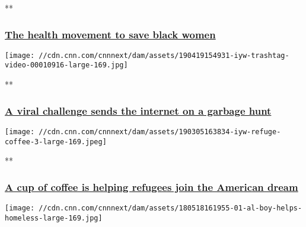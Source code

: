 **

\hypertarget{the-health-movement-to-save-black-women-}{%
\subsubsection{\texorpdfstring{\href{/videos/tv/2019/05/21/iyw-girl-trek.cnn/video/playlists/impact-your-world/}{The
health movement to save black women
}}{The health movement to save black women }}\label{the-health-movement-to-save-black-women-}}

\href{/videos/tv/2019/04/19/iyw-trashtag-video.cnn/video/playlists/impact-your-world/}{}

\texttt{[image: //cdn.cnn.com/cnnnext/dam/assets/190419154931-iyw-trashtag-video-00010916-large-169.jpg]}

**

\hypertarget{a-viral-challenge-sends-the-internet-on-a-garbage-hunt}{%
\subsubsection{\texorpdfstring{\href{/videos/tv/2019/04/19/iyw-trashtag-video.cnn/video/playlists/impact-your-world/}{A
viral challenge sends the internet on a garbage
hunt}}{A viral challenge sends the internet on a garbage hunt}}\label{a-viral-challenge-sends-the-internet-on-a-garbage-hunt}}

\href{/videos/tv/2019/03/05/iyw-refuge-coffee.cnn/video/playlists/impact-your-world/}{}

\texttt{[image: //cdn.cnn.com/cnnnext/dam/assets/190305163834-iyw-refuge-coffee-3-large-169.jpeg]}

**

\hypertarget{a-cup-of-coffee-is-helping-refugees-join-the-american-dream}{%
\subsubsection{\texorpdfstring{\href{/videos/tv/2019/03/05/iyw-refuge-coffee.cnn/video/playlists/impact-your-world/}{A
cup of coffee is helping refugees join the American
dream}}{A cup of coffee is helping refugees join the American dream}}\label{a-cup-of-coffee-is-helping-refugees-join-the-american-dream}}

\href{/videos/tv/2018/05/21/iyw-boy-helps-homeless-trnd.cnn/video/playlists/impact-your-world/}{}

\texttt{[image: //cdn.cnn.com/cnnnext/dam/assets/180518161955-01-al-boy-helps-homeless-large-169.jpg]}


